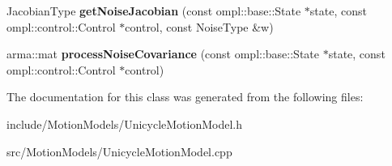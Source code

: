\begin{DoxyCompactItemize}
\item 
\hypertarget{class_unicycle_motion_model_a62aa73b58447613c0745dab9453760b7}{\-Jacobian\-Type {\bfseries get\-Noise\-Jacobian} (const ompl\-::base\-::\-State $\ast$state, const ompl\-::control\-::\-Control $\ast$control, const \-Noise\-Type \&w)}\label{class_unicycle_motion_model_a62aa73b58447613c0745dab9453760b7}

\item 
\hypertarget{class_unicycle_motion_model_a1ae47461abed522cc1d611a1f60b6f7c}{arma\-::mat {\bfseries process\-Noise\-Covariance} (const ompl\-::base\-::\-State $\ast$state, const ompl\-::control\-::\-Control $\ast$control)}\label{class_unicycle_motion_model_a1ae47461abed522cc1d611a1f60b6f7c}

\end{DoxyCompactItemize}


\-The documentation for this class was generated from the following files\-:\begin{DoxyCompactItemize}
\item 
include/\-Motion\-Models/\-Unicycle\-Motion\-Model.\-h\item 
src/\-Motion\-Models/\-Unicycle\-Motion\-Model.\-cpp\end{DoxyCompactItemize}
